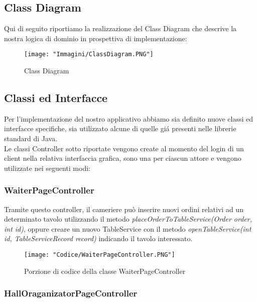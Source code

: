 \documentclass{article}
\begin{document}

\newpage

\subsection{Class Diagram}
Qui di seguito riportiamo la realizzazione del Class Diagram che descrive la nostra logica di dominio in prospettiva di implementazione:

\begin{figure}[!h]
\centering
\texttt{[image: "Immagini/ClassDiagram.PNG"]}
\caption{Class Diagram}
\label{ClassDiagram}
\end{figure}

\newpage

\subsection{Classi ed Interfacce}
Per l'implementazione del nostro applicativo abbiamo sia definito nuove classi ed interfacce specifiche, sia utilizzato alcune di quelle gi\'a presenti nelle librerie standard di Java. \\
Le classi Controller sotto riportate vengono create al momento del login di un client nella relativa interfaccia grafica, sono una per ciascun attore e vengono utilizzate nei seguenti modi: 

\subsubsection{WaiterPageController}

Tramite questo controller, il cameriere può inserire nuovi ordini relativi ad un determinato tavolo utilizzando il metodo \textit{placeOrderToTableService(Order order, int id)}, oppure creare un nuovo TableService con il metodo \textit{openTableService(int id, TableServiceRecord record)} indicando il tavolo interessato.

\begin{figure}[!h]
\centering
\texttt{[image: "Codice/WaiterPageController.PNG"]}
\caption{Porzione di codice della classe WaiterPageController}
\end{figure}


\subsubsection{HallOraganizatorPageController}
\end{document}
